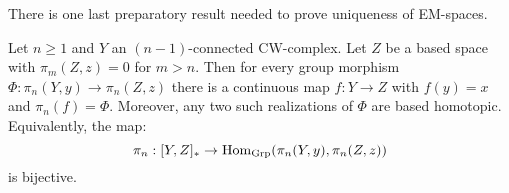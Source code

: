 

There is one last preparatory result needed to prove uniqueness of EM-spaces.

\begin{theorem}
Let $n\geq1$ and $Y$ an $(n-1)$-connected CW-complex. Let $Z$ be a based space with $\pi_m(Z,z)=0$ for $m>n$. Then for every group morphism $\Phi:\pi_n(Y,y)\to\pi_n(Z,z)$ there is a continuous map $f:Y\to Z$ with $f(y)=x$ and $\pi_n(f)=\Phi$. Moreover, any two such realizations of $\Phi$ are based homotopic. Equivalently, the map:
\[\pi_n:[Y,Z]_*\to\operatorname{Hom}_{\mathrm{Grp}}(\pi_n(Y,y),\pi_n(Z,z))\]
is bijective.
\end{theorem}


